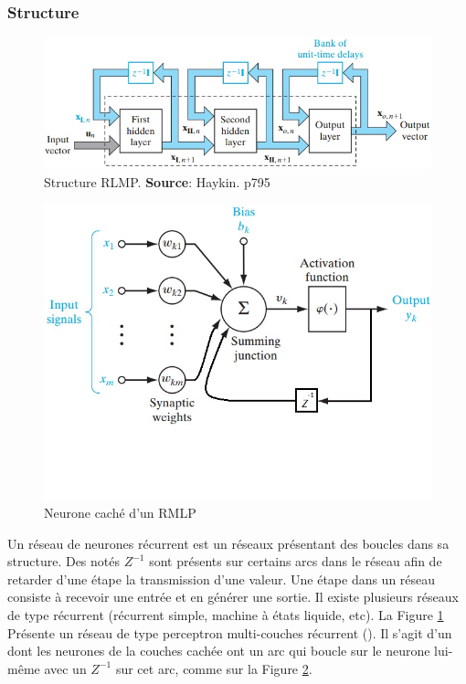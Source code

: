 \documentclass[12pt,a4paper,oneside, titlepage]{article}
\begin{document}
\subsubsection*{Structure}
\begin{figure}
 \centering
 \includegraphics[scale=0.5]{../figures/structurermlp.jpg}
 \caption{Structure RLMP. \textbf{Source}: Haykin. p795\cite{Haykin}}
 \label{structurermlp}
\end{figure}
\begin{figure}
 \centering
 \includegraphics[scale=0.5]{../figures/neuronermlp.jpg}
 \caption{Neurone caché d'un RMLP}
 \label{neuronermlp}
\end{figure}
Un réseau de neurones récurrent est un réseaux présentant des boucles dans sa structure.
Des  notés $Z^{-1}$ sont présents sur certains arcs dans le réseau afin de retarder d'une étape la transmission d'une valeur.
Une étape dans un réseau consiste à recevoir une entrée et en générer une sortie.
Il existe plusieurs réseaux de type récurrent (récurrent simple, machine à états liquide, etc).
La Figure \ref{structurermlp} Présente un réseau de type perceptron multi-couches récurrent (\rmlp).
Il s'agit d'un \mlp dont les neurones de la couches cachée ont un arc qui boucle sur le neurone lui-même avec un $Z^{-1}$ sur cet arc, comme sur la Figure \ref{neuronermlp}.
\end{document}
